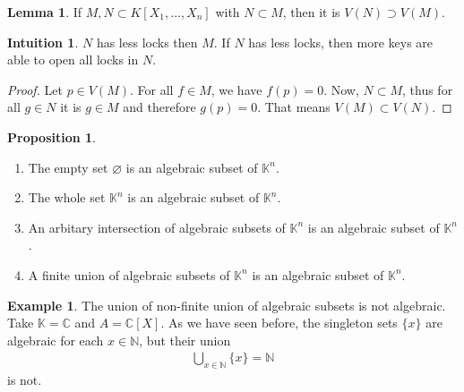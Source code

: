 \documentclass[a4paper]{book}
\theoremstyle{definition}
\newtheorem{example}{Example}[definition]
\newtheorem{lemma}[definition]{Lemma}
\newtheorem{proposition}[definition]{Proposition}
\newtheorem*{intuition}{Intuition}
\begin{document}
\begin{thmbox}
    \begin{lemma}
            If \(M, N \subset K[X_1, \ldots, X_n]\) with \(N \subset M\), then it is \(V(N) \supset V(M)\).
    \end{lemma}
\end{thmbox}
\begin{intbox}
    \begin{intuition}
            \(N\) has less locks then \(M\). If \(N\) has less locks, then more keys are able to open all locks in \(N\).
    \end{intuition}
\end{intbox}
\begin{proof}
    Let \(p \in V(M)\). For all \(f \in M\), we have \(f(p) = 0\). Now, \(N \subset M\), thus for all \(g \in N\) it is \(g \in M\) and therefore \(g(p) = 0\). That means \(V(M) \subset V(N)\).
\end{proof}
\begin{thmbox}
    \begin{proposition}
        \begin{enumerate}
            \item The empty set \(\varnothing\) is an algebraic subset of \(\mathbb{K}^n\).
            \item The whole set \(\mathbb{K}^n\) is an algebraic subset of \(\mathbb{K}^n\).
            \item An arbitary intersection of algebraic subsets of \(\mathbb{K}^n\) is an algebraic subset of \(\mathbb{K}^n\).
            \item A finite union of algebraic subsets of \(\mathbb{K}^n\) is an algebraic subset of \(\mathbb{K}^n\).
        \end{enumerate}
    \end{proposition}
\end{thmbox}
\begin{exmbox}
    \begin{example}
    The union of non-finite union of algebraic subsets is not algebraic. Take \(\mathbb{K} = \mathbb{C}\) and \(A = \mathbb{C}[X]\). As we have seen before, the singleton sets \(\{x\}\) are algebraic for each \(x \in \mathbb{N}\), but their union
    \begin{align*}
        \bigcup_{x \in \mathbb{N}} \{x\} = \mathbb{N}
    \end{align*}
    is not.
    \end{example}
\end{exmbox}
\end{document}
